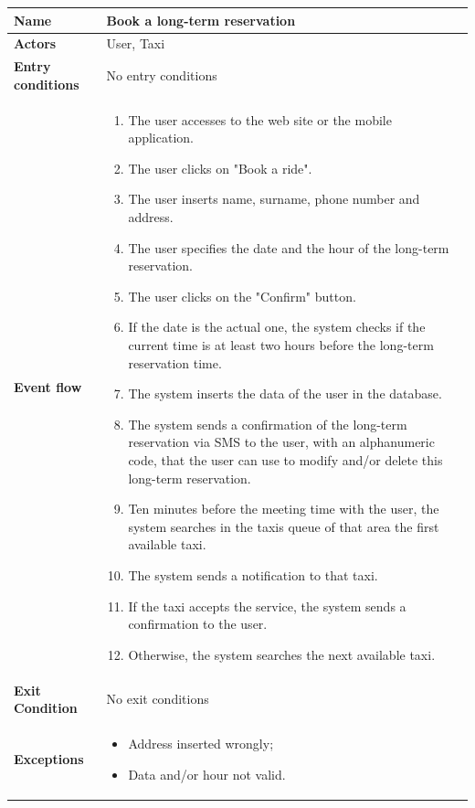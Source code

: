 		\begin{tabular}{l l}
		 \textbf {Name} & Book a long-term reservation  \\ \hline
		 \textbf{Actors} & User, Taxi \\ \hline
		 \textbf{Entry conditions} & No entry conditions \\ \hline
		 \textbf{Event flow} & 
		 \parbox{0.7\textwidth}{
		 \begin{enumerate}
		 \item The user accesses to the web site or the mobile application.
		 \item The user clicks on "Book a ride".
		 \item The user inserts name, surname, phone number and address.
		 \item The user specifies the date and the hour of the long-term reservation.
		 \item The user clicks on the "Confirm" button.
		 \item If the date is the actual one, the system checks if the current time is at least two hours before the long-term reservation time.
		 \item The system inserts the data of the user in the database.
		  \item The system sends a confirmation of the long-term reservation via SMS to the user, with an alphanumeric code, that the user can use to modify and/or delete this long-term reservation.
		 \item Ten minutes before the meeting time with the user, the system searches in the taxis queue of that area the first available taxi.
		 \item The system sends a notification to that taxi.
		 \item If the taxi accepts the service, the system sends a confirmation to the user.
		 \item Otherwise, the system searches the next available taxi.
		 \end{enumerate}
		 } \\ \hline
		 \textbf{Exit Condition} & No exit conditions\\ \hline
		 \textbf{Exceptions} & \parbox{0.7\textwidth}{ 
		 \begin{itemize}
		 \item Address inserted wrongly;
		 \item Data and/or hour not valid.
		 \end{itemize}
		 }
		\end{tabular}
		
